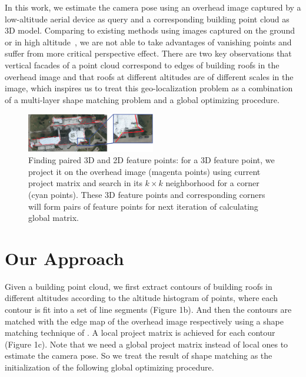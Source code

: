 \documentclass[sigconf,review,anonymous]{acmart}
\begin{document}
In this work, we estimate the camera pose using an overhead image captured by a low-altitude aerial device as query and a corresponding building point cloud as 3D model. Comparing to existing methods using images captured on the ground~\cite{instant} or in high altitude~\cite{FDCM}, we are not able to take advantages of vanishing points and suffer from more critical perspective effect. There are two key observations that vertical facades of a point cloud correspond to edges of building roofs in the overhead image and that roofs at different altitudes are of different scales in the image, which inspires us to treat this geo-localization problem as a combination of a multi-layer shape matching problem and a global optimizing procedure. 
%
 \begin{figure}
 	\centering
 	\vspace{2.0cm}
 	\includegraphics[width=0.5\textwidth]{figures/details_png}
 	\caption{Finding paired 3D and 2D feature points: for a 3D feature point, we project it on the overhead image (magenta points) using current project matrix and search in its $k\times k$ neighborhood for a corner (cyan points). These 3D feature points and corresponding corners will form pairs of feature points for next iteration of calculating global matrix.}
 	\label{fig:overview}
 \end{figure}
\section{Our Approach}
Given a building point cloud, we first extract contours of building roofs in different altitudes according to the altitude histogram of points, where each contour is fit into a set of line segments (Figure 1b). And then the contours are matched with the edge map of the overhead image respectively using a shape matching technique of \cite{FDCM}. A local project matrix is achieved for each contour (Figure 1c). Note that we need a global project matrix instead of local ones to estimate the camera pose. So we treat the result of shape matching as the initialization of the following global optimizing procedure. 
\end{document}
